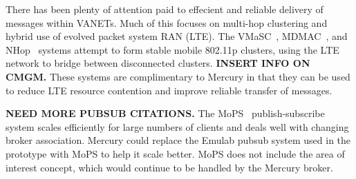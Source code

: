 
There has been plenty of attention paid to effecient and reliable
delivery of messages within VANETs.  Much of this focuses on multi-hop
clustering and hybrid use of evolved packet system RAN (LTE).  The
VMaSC~\cite{VMaSC}, MDMAC~\cite{MDMAC}, and NHop~\cite{NHop} systems
attempt to form stable mobile 802.11p clusters, using the LTE network
to bridge between disconnected clusters. {\bf INSERT INFO ON CMGM.}
These systems are complimentary to Mercury in that they can be used to
reduce LTE resource contention and improve reliable transfer of
messages.

{\bf NEED MORE PUBSUB CITATIONS.}
The MoPS~\cite{MoPS} publish-subscribe system scales efficiently for
large numbers of clients and deals well with changing broker
association.  Mercury could replace the Emulab pubsub system used in
the prototype with MoPS to help it scale better. MoPS does not include
the area of interest concept, which would continue to be handled by
the Mercury broker.
